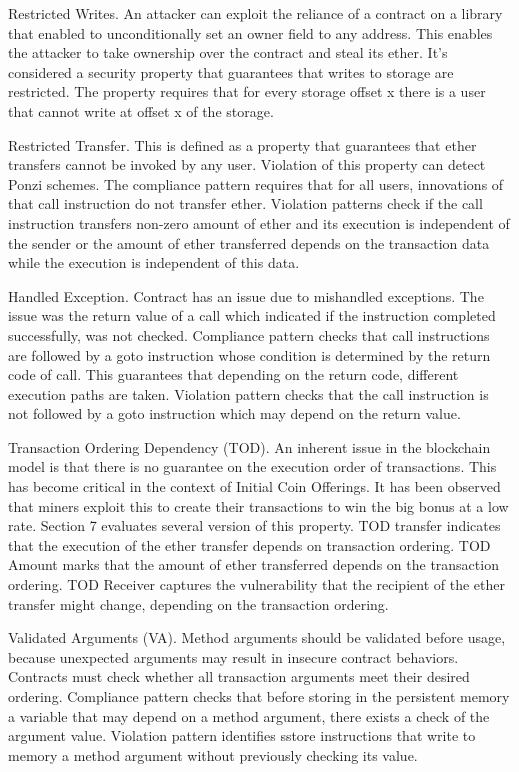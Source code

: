 \documentclass{article}
\begin{document}
Restricted Writes. An attacker can exploit the reliance of a contract on a library that enabled to unconditionally set an owner field to any address. This enables the attacker to take ownership over the contract and steal its ether. It's considered a security property that guarantees that writes to storage are restricted. The property requires that for every storage offset x there is a user that cannot write at offset x of the storage.

Restricted Transfer. This is defined as a property that guarantees that ether transfers cannot be invoked by any user. Violation of this property can detect Ponzi schemes. The compliance pattern requires that for all users, innovations of that call instruction do not transfer ether. Violation patterns check if the call instruction transfers non-zero amount of ether and its execution is independent of the sender or the amount of ether transferred depends on the transaction data while the execution is independent of this data.

Handled Exception. Contract has an issue due to mishandled exceptions. The issue was the return value of a call which indicated if the instruction completed successfully, was not checked. Compliance pattern checks that call instructions are followed by a goto instruction whose condition is determined by the return code of  call. This guarantees that depending on the return code, different execution paths are taken. Violation pattern checks that the call instruction is not followed by a goto instruction which may depend on the return value.

Transaction Ordering Dependency (TOD). An inherent issue in the blockchain model is that there is no guarantee on the execution order of transactions. This has become critical in the context of Initial Coin Offerings. It has been observed that miners exploit this to create their transactions to win the big bonus at a low rate. Section 7 evaluates several version of this property. TOD transfer indicates that the execution of the ether transfer depends on transaction ordering. TOD Amount marks that the amount of ether transferred depends on the transaction ordering. TOD Receiver captures the vulnerability that the recipient of the ether transfer might change, depending on the transaction ordering.

Validated Arguments (VA). Method arguments should be validated before usage, because unexpected arguments may result in insecure contract behaviors. Contracts must check whether all transaction arguments meet their desired ordering. Compliance pattern checks that before storing in the persistent memory a variable that may depend on a method argument, there exists a check of the argument value. Violation pattern identifies sstore instructions that write to memory a method argument without previously checking its value.
\end{document}
